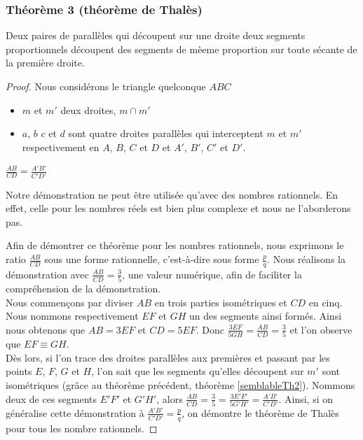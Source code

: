 \documentclass[a4paper,12pt]{article}
\begin{document}
\pagebreak
\subsubsection{Théorème 3 (théorème de Thalès)}
\begin{theorem}
Deux paires de parallèles qui découpent sur une droite deux segments proportionnels découpent des segments de mèeme proportion sur toute sécante de la première droite.
\end{theorem}

\begin{proof}
Nous considérons le triangle quelconque $ABC$ 
\begin{hyp}

\begin{itemize}
    \item $m$ et $m'$ deux droites, $m \cap m'$
    \item $a$, $b$ $c$ et $d$ sont quatre droites parallèles qui interceptent $m$ et $m'$ respectivement en $A$, $B$, $C$ et $D$ et $A'$, $B'$, $C'$ et $D'$.
\end{itemize}

\end{hyp}

\begin{concl}
$\frac{AB}{CD} = \frac{A'B'}{C'D'}$
\end{concl}

\begin{remark}
Notre démonstration ne peut être utilisée qu'avec des nombres rationnels. En effet, celle pour les nombres réels est bien plus complexe et nous ne l'aborderons pas.
\end{remark}

Afin de démontrer ce théorème pour les nombres rationnels, nous exprimons le ratio $\frac{AB}{CD}$ sous une forme rationnelle, c'est-à-dire sous forme $\frac{p}{q}$. Nous réalisons la démonstration avec $\frac{AB}{CD} = \frac{3}{5}$, une valeur numérique, afin de faciliter la compréhension de la démonstration.\\

Nous commençons par diviser $AB$ en trois parties isométriques et $CD$ en cinq. Nous nommons respectivement $EF$ et $GH$ un des segments ainsi formés.
Ainsi nous obtenons que $AB = 3EF$ et $CD = 5EF$. Donc $\frac{3EF}{5GH} = \frac{AB}{CD} = \frac{3}{5}$ et l'on observe que $EF \equiv GH$.\\

 Dès lors, si l'on trace des droites parallèles aux premières et passant par les points $E$, $F$, $G$ et $H$, l'on sait que les segments qu'elles découpent sur $m'$ sont isométriques (grâce au théorème précédent, théorème \ref{semblableTh2}). Nommons deux de ces segments $E'F'$ et $G'H'$, alors $\frac{AB}{CD} = \frac{3}{5} = \frac{3E'F'}{5G'H'} = \frac{A'B'}{C'D'}$.
Ainsi, si on généralise cette démonstration à $\frac{A'B'}{C'D'} = \frac{p}{q}$, on démontre le théorème de Thalès pour tous les nombre rationnels.
\end{proof}
\end{document}
